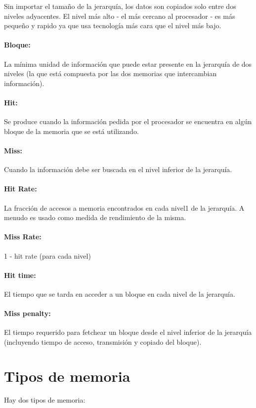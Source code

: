 Sin importar el tamaño de la jerarquía, los datos son copiados solo entre dos niveles adyacentes. El nivel más alto - el más cercano al procesador - es más pequeño y rapido ya que usa tecnología más cara que el nivel más bajo.

\paragraph{Bloque:} La mínima unidad de información que puede estar presente en la jerarquía de dos niveles (la que está compuesta por las dos memorias que intercambian información).

\paragraph{Hit:} Se produce cuando la información pedida por el procesador se encuentra en algún bloque de la memoria que se está utilizando.

\paragraph{Miss:} Cuando la información debe ser buscada en el nivel inferior de la jerarquía.

\paragraph{Hit Rate:} La fracción de accesos a memoria encontrados en cada nivel1 de la jerarquía. A menudo es usado como medida de rendimiento de la misma.

\paragraph{Miss Rate: } 1 - hit rate (para cada nivel)

\paragraph{Hit time:} El tiempo que se tarda en acceder a un bloque en cada nivel de la jerarquía.

\paragraph{Miss penalty:} El tiempo requerido para fetchear un bloque desde el nivel inferior de la jerarquía (incluyendo tiempo de acceso, transmisión y copiado del bloque).

\newpage
\section{Tipos de memoria}\label{sec::Memoria::Tipos}
Hay dos tipos de memoria:


